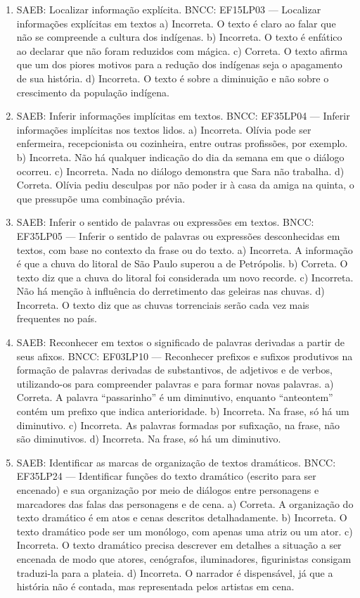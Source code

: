 \begin{enumerate}
\item
SAEB: Localizar informação explícita. BNCC: EF15LP03 --- Localizar informações explícitas em textos a) Incorreta. O texto é claro ao falar que não se compreende a cultura dos indígenas. b) Incorreta. O texto é enfático ao declarar que não foram reduzidos com mágica. c) Correta. O texto afirma que um dos piores motivos para a redução dos indígenas seja o apagamento de sua história. d) Incorreta. O texto é sobre a diminuição e não sobre o crescimento da população indígena.

\item
SAEB: Inferir informações implícitas em textos. BNCC: EF35LP04 --- Inferir informações implícitas nos textos lidos. a) Incorreta. Olívia pode ser enfermeira, recepcionista ou cozinheira, entre outras profissões, por exemplo. b) Incorreta. Não há qualquer indicação do dia da semana em que o diálogo ocorreu. c) Incorreta. Nada no diálogo demonstra que Sara não trabalha. d) Correta. Olívia pediu desculpas por não poder ir à casa da amiga na quinta, o que pressupõe uma combinação prévia.

\item
SAEB: Inferir o sentido de palavras ou expressões em textos. BNCC: EF35LP05 --- Inferir o sentido de palavras ou expressões desconhecidas em textos, com base no contexto da frase ou do texto. a) Incorreta. A informação é que a chuva do litoral de São Paulo superou a de Petrópolis. b) Correta. O texto diz que a chuva do litoral foi considerada um novo recorde. c) Incorreta. Não há menção à influência do derretimento das geleiras nas chuvas. d) Incorreta. O texto diz que as chuvas torrenciais serão cada vez mais frequentes no país.

\item
SAEB: Reconhecer em textos o significado de palavras derivadas a partir de seus afixos. BNCC: EF03LP10 --- Reconhecer prefixos e sufixos produtivos na formação de palavras derivadas de substantivos, de adjetivos e de verbos, utilizando-os para compreender palavras e para formar novas palavras. a) Correta. A palavra ``passarinho'' é um diminutivo, enquanto ``anteontem'' contém um prefixo que indica anterioridade. b) Incorreta. Na frase, só há um diminutivo. c) Incorreta. As palavras formadas por sufixação, na frase, não são diminutivos. d) Incorreta. Na frase, só há um diminutivo.

\item
SAEB: Identificar as marcas de organização de textos dramáticos. BNCC: EF35LP24 --- Identificar funções do texto dramático (escrito para ser encenado) e sua organização por meio de diálogos entre personagens e marcadores das falas das personagens e de cena. a) Correta. A organização do texto dramático é em atos e cenas descritos detalhadamente. b) Incorreta. O texto dramático pode ser um monólogo, com apenas uma atriz ou um ator. c) Incorreta. O texto dramático precisa descrever em detalhes a situação a ser encenada de modo que atores, cenógrafos, iluminadores, figurinistas consigam traduzi-la para a plateia. d) Incorreta. O narrador é dispensável, já que a história não é contada, mas representada pelos artistas em cena.


\end{enumerate}
